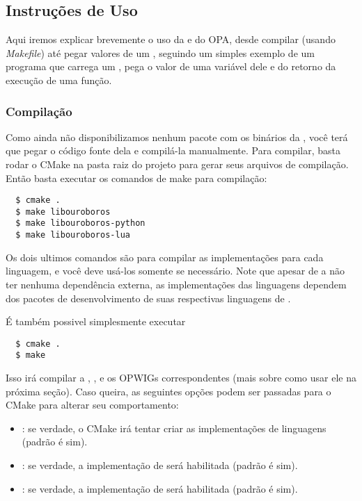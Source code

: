 \subsection{Instruções de Uso}
Aqui iremos explicar brevemente o uso da  e do OPA, desde compilar
(usando \textit{Makefile}) até pegar valores de um \script{}, seguindo um 
simples exemplo de um programa que carrega um \script{}, pega o valor de uma
variável dele e do retorno da execução de uma função.

\subsubsection{Compilação} 
Como ainda não disponibilizamos nenhum pacote
com os binários da , você terá que pegar o código fonte dela
e compilá-la manualmente. Para compilar, basta rodar o CMake na pasta 
raiz do projeto para gerar seus arquivos de compilação. Então basta 
executar os comandos de make para compilação:
\begin{verbatim}
  $ cmake .
  $ make libouroboros
  $ make libouroboros-python
  $ make libouroboros-lua
\end{verbatim}
Os dois ultimos comandos são para compilar as implementações para cada linguagem,
e você deve usá-los somente se necessário. Note que apesar de a  não
ter nenhuma dependência externa, as implementações das linguagens dependem dos
pacotes de desenvolvimento de suas respectivas linguagens de \script{}.

É também possivel simplesmente executar
\begin{verbatim}
  $ cmake .
  $ make
\end{verbatim}
Isso irá compilar a , ,  e 
os OPWIGs correspondentes (mais sobre como usar ele na próxima seção). Caso queira, as
seguintes opções podem ser passadas para o CMake para alterar seu comportamento:
\begin{itemize}
  \item {}: se verdade, o CMake irá tentar criar as 
    implementações de linguagens (padrão é sim).
  \item {}: se verdade, a implementação de  será 
    habilitada (padrão é sim).
  \item {}: se verdade, a implementação de 
    será habilitada (padrão é sim).
\end{itemize}

